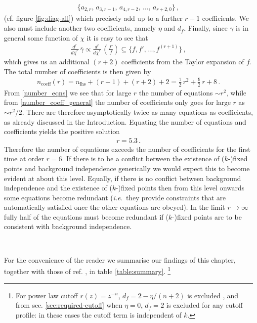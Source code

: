\documentclass[11pt]{book} %
\newcommand\ie{\textit{i.e.}\ }
\numberwithin{equation}{chapter}
\begin{document}
\begin{align}
  \bigg\lbrace
  a_{2,r},\, a_{3,r-1},\, a_{4,r-2},\, \dots,\, a_{r+2,0}
  \bigg\rbrace \,,
\end{align}
(cf. figure \ref{fig:diag-all}) which precisely add up to a further $r+1$ coefficients.
We also must include another two coefficients, namely $\eta$ and $d_f$.
Finally, since $\gamma$ is in general some function of $\chi$ it is easy to see that
\begin{align}
  \frac{d^r}{d \bar\chi^r} \, \bar{\gamma} \propto \frac{d^r}{d \bar\chi^r} \, \left( \frac{f'}{f}\right) \subseteq
  \bigg\lbrace f, f', \dots, f^{(r+1)}   \bigg\rbrace \,,
\end{align}
which gives us an additional $(r+2)$ coefficients from the Taylor expansion of $f$.
The total number of coefficients is then given by
\begin{align}
  \label{number_coeff_general}
  n_{\text{coeff}}(r) = n_{\text{lhs}} + (r+1) + (r+2) + 2  = \frac{1}{2} \, r^2 + \frac{9}{2} \, r + 8 \,.
\end{align}
From \eqref{number_eqns} we see that for large $r$ the number of equations $\sim r^2$,
while from \eqref{number_coeff_general} the number of coefficients only goes for large $r$ as $\sim r^2/2$.
There are therefore asymptotically twice as many equations as coefficients,
as already discussed in the Introduction.
Equating the number of equations and coefficients yields the positive solution
\begin{align}
  r = 5.3 \,.
\end{align}
Therefore the number of equations exceeds the number of coefficients for the first time at order $r=6$.
If there is to be a conflict between the existence of ($k$-)fixed points and background independence
generically we would expect this to become evident at about this level.
Equally, if there is no conflict between background independence and the existence of ($k$-)fixed points
then from this level onwards some equations become redundant
(\ie they provide constraints that are automatically satisfied once the other equations are obeyed).
In the limit $r\to\infty$ fully half of the equations must become redundant if ($k$-)fixed points are
to be consistent with background independence.

~

For the convenience of the reader we summarise our findings of this chapter,
together with those of ref. \cite{Dietz:2015owa}, in table \ref{table:summary}.%
\footnote{
  For power law cutoff  $r(z)=z^{-n}$, $d_f = 2-\eta/(n+2)$ is excluded \cite{Dietz:2015owa},
  and from sec. \ref{sec:required-cutoff} when $\eta=0$,  $d_f=2$ is excluded for any cutoff profile:
  in these cases the cutoff term is independent of $k$.
}
\end{document}
